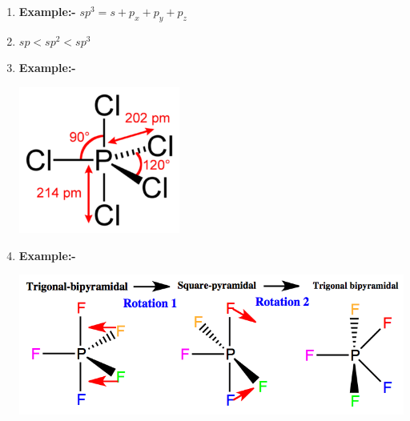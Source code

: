 \documentclass[12pt]{article}
\def\dt{\tikz\tzdot*(0, 0)(5pt);}
\begin{document}
\begin{enumerate}
\item[\dt] \textbf{Example:-}	$sp^3 = s + p_x + p_y + p_z$ 
\pagebreak

\item[\dt] $sp < sp^2 < sp^3$

\item[\dt] \textbf{Example:-} 
\begin{center}
\includegraphics[scale=15]{pcl5.png}
\end{center}

\pagebreak
\item[\dt] \textbf{Example:-} 
\begin{center}
\includegraphics[scale=0.3]{pf5.png}
\end{center}

\pagebreak
$~$\hfill

\pagebreak

$~$\hfill

\pagebreak

$~$\hfill

\pagebreak

$~$\hfill
\pagebreak

$~$\hfill
\pagebreak



\end{enumerate}
\end{document}
